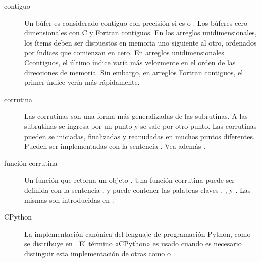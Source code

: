 \documentclass[a4,10pt,spanish]{sphinxmanual}
\begin{document}
\begin{description}
\item[{contiguo\label{\detokenize{glossary:term-contiguous}}}] \leavevmode
{}\ignorespaces 
\sphinxAtStartPar
Un búfer es considerado contiguo con precisión si es  o . Los búferes cero dimensionales con C y Fortran contiguos. En los arreglos unidimensionales, los ítems deben ser dispuestos en memoria uno siguiente al otro, ordenados por índices que comienzan en cero. En arreglos unidimensionales C\sphinxhyphen{}contiguos, el último índice varía más velozmente en el orden de las direcciones de memoria. Sin embargo, en arreglos Fortran contiguos, el primer índice vería más rápidamente.

\item[{corrutina\label{\detokenize{glossary:term-coroutine}}}] \leavevmode
\sphinxAtStartPar
Las corrutinas son una forma más generalizadas de las subrutinas. A las subrutinas se ingresa por un punto y se sale por otro punto. Las corrutinas pueden se iniciadas, finalizadas y reanudadas en muchos puntos diferentes. Pueden ser implementadas con la sentencia . Vea además .

\item[{función corrutina\label{\detokenize{glossary:term-coroutine-function}}}] \leavevmode
\sphinxAtStartPar
Un función que retorna un objeto  {\hyperref[\detokenize{glossary:term-coroutine}]{}} . Una función corrutina puede ser definida con la sentencia , y puede contener las palabras claves , , y . Las mismas son introducidas en .

\item[{CPython\label{\detokenize{glossary:term-CPython}}}] \leavevmode
\sphinxAtStartPar
La implementación canónica del lenguaje de programación Python, como se distribuye en . El término «CPython» es usado cuando es necesario distinguir esta implementación de otras como  o .


\end{description}
\end{document}
